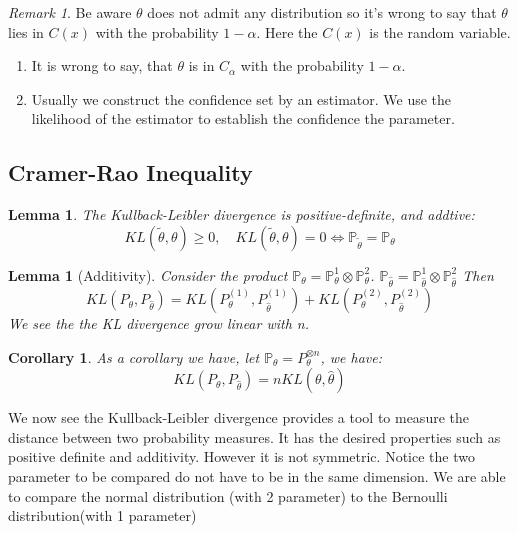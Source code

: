 \documentclass[a4paper,12pt, oneside, fleqn]{book}
\newtheorem{corollary}{Corollary}[theorem]
\newtheorem{lemma}[theorem]{Lemma}
\theoremstyle{definition}
\theoremstyle{remark}
\newtheorem*{remark}{Remark}
\begin{document}
\begin{remark}
Be aware $\theta$ does not admit any distribution so it's wrong to say that $\theta$ lies in $C(x)$ with the probability $1 - \alpha$. Here the $C(x)$ is the random variable.
\begin{enumerate}
    \item It is wrong to say, that $\theta$ is in $C_{\alpha}$ with the probability $1 - \alpha$.
    \item Usually we construct the confidence set by an estimator. We use the likelihood of the estimator to establish the confidence the parameter.
\end{enumerate}
\end{remark}



\subsection{Cramer-Rao Inequality}
\begin{lemma}
The Kullback-Leibler divergence is positive-definite, and addtive:
	\begin{equation*}
		KL(\tilde{\theta}, \theta) \geq 0, \quad		KL(\tilde{\theta}, \theta) = 0 \Leftrightarrow \mathbb{P}_{\tilde{\theta}} = \mathbb{P}_{\theta}
	\end{equation*}
\end{lemma}

\begin{lemma}[Additivity]
	Consider the product $\mathbb{P}_\theta = \mathbb{P}_\theta^{1} \otimes \mathbb{P}_\theta^{2}$. $\mathbb{P}_{\hat{\theta}} = \mathbb{P}_{\hat{\theta}}^1 \otimes \mathbb{P}_{\hat{\theta}}^2$  Then 
	\begin{equation}
		KL(P_\theta, P_{\hat{\theta}}) = KL(P_\theta^{(1)} , P_{\hat{\theta}}^{(1)}) + KL(P_\theta^{(2)} , P_{\hat{\theta}}^{(2)})
	\end{equation}
	We see the the KL divergence grow linear with n.
\end{lemma}

\begin{corollary}
	As a corollary we have, let $\mathbb{P}_\theta = P_\theta^{\otimes n}$, we have:
	\begin{equation}
		KL(P_\theta, P_{\hat{\theta}}) = nKL(\theta, \hat{\theta})
	\end{equation}
\end{corollary}

We now see the Kullback-Leibler divergence provides a tool to measure the distance between two probability measures. It has the desired properties such as positive definite and additivity. However it is not symmetric. Notice the two parameter to be compared do not have to be in the same dimension. We are able to compare the normal distribution (with 2 parameter) to the Bernoulli distribution(with 1 parameter)
\end{document}
